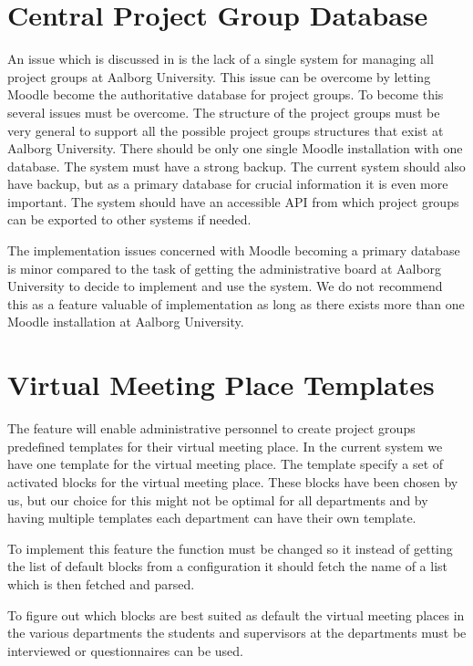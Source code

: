 \section{Central Project Group Database}
An issue which is discussed in  is the lack of a single system for managing all project groups at Aalborg University. 
This issue can be overcome by letting Moodle become the authoritative database for project groups. 
To become this several issues must be overcome. 
The structure of the project groups must be very general to support all the possible project groups structures that exist at Aalborg University. 
There should be only one single Moodle installation with one database. 
The system must have a strong backup.
The current system should also have backup, but as a primary database for crucial information it is even more important. 
The system should have an accessible API from which project groups can be exported to other systems if needed. 

The implementation issues concerned with Moodle becoming a primary database is minor compared to the task of getting the administrative board at Aalborg University to decide to implement and use the system. 
We do not recommend this as a feature valuable of implementation as long as there exists more than one Moodle installation at Aalborg University. 


\section{Virtual Meeting Place Templates} 
The feature will enable administrative personnel to create project groups predefined templates for their virtual meeting place. 
In the current system we have one template for the virtual meeting place. 
The template specify a set of activated blocks for the virtual meeting place. 
These blocks have been chosen by us, but our choice for this might not be optimal for all departments and by having multiple templates each department can have their own template.

To implement this feature the function  must be changed so it instead of getting the list of default blocks from a configuration it should fetch the name of a list which is then fetched and parsed. 

To figure out which blocks are best suited as default the virtual meeting places in the various departments the students and supervisors at the departments must be interviewed or questionnaires can be used. 